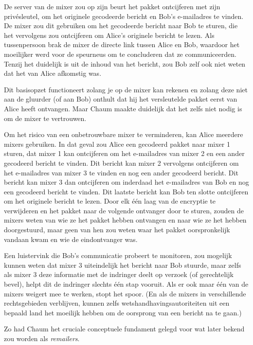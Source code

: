 \documentclass[
  a5paper,
  smalldemyvopaper,11pt,twoside,onecolumn,openright,extrafontsizes]{memoir}
\begin{document}
De server van de mixer zou op zijn beurt het pakket ontcijferen met zijn
privésleutel, om het originele gecodeerde bericht en Bob's e-mailadres
te vinden. De mixer zou dit gebruiken om het gecodeerde bericht naar Bob
te sturen, die het vervolgens zou ontcijferen om Alice's originele
bericht te lezen. Als tussenpersoon brak de mixer de directe link tussen
Alice en Bob, waardoor het moeilijker werd voor de speurneus om te
concluderen dat ze communiceerden. Tenzij het duidelijk is uit de inhoud
van het bericht, zou Bob zelf ook niet weten dat het van Alice afkomstig
was.

Dit basisopzet functioneert zolang je op de mixer kan rekenen en zolang
deze niet aan de gluurder (of aan Bob) onthult dat hij het versleutelde
pakket eerst van Alice heeft ontvangen. Maar Chaum maakte duidelijk dat
het zelfs niet nodig is om de mixer te vertrouwen.

Om het risico van een onbetrouwbare mixer te verminderen, kan Alice
meerdere mixers gebruiken. In dat geval zou Alice een gecodeerd pakket
naar mixer 1 sturen, dat mixer 1 kan ontcijferen om het e-mailadres van
mixer 2 en een ander gecodeerd bericht te vinden. Dit bericht kan mixer
2 vervolgens ontcijferen om het e-mailadres van mixer 3 te vinden en nog
een ander gecodeerd bericht. Dit bericht kan mixer 3 dan ontcijferen om
inderdaad het e-mailadres van Bob en nog een gecodeerd bericht te
vinden. Dit laatste bericht kan Bob ten slotte ontcijferen om het
originele bericht te lezen. Door elk één laag van de encryptie te
verwijderen en het pakket naar de volgende ontvanger door te sturen,
zouden de mixers weten van wie ze het pakket hebben ontvangen en naar
wie ze het hebben doorgestuurd, maar geen van hen zou weten waar het
pakket oorspronkelijk vandaan kwam en wie de eindontvanger was.

Een luistervink die Bob's communicatie probeert te monitoren, zou
mogelijk kunnen weten dat mixer 3 uiteindelijk het bericht naar Bob
stuurde, maar zelfs als mixer 3 deze informatie met de indringer deelt
op verzoek (of gerechtelijk bevel), helpt dit de indringer slechts één
stap vooruit. Als er ook maar één van de mixers weigert mee te werken,
stopt het spoor. (En als de mixers in verschillende rechtsgebieden
verblijven, kunnen zelfs wetshandhavingsautoriteiten uit een bepaald
land het moeilijk hebben om de oorsprong van een bericht na te gaan.)

Zo had Chaum het cruciale conceptuele fundament gelegd voor wat later
bekend zou worden als \emph{remailers}.
\end{document}
